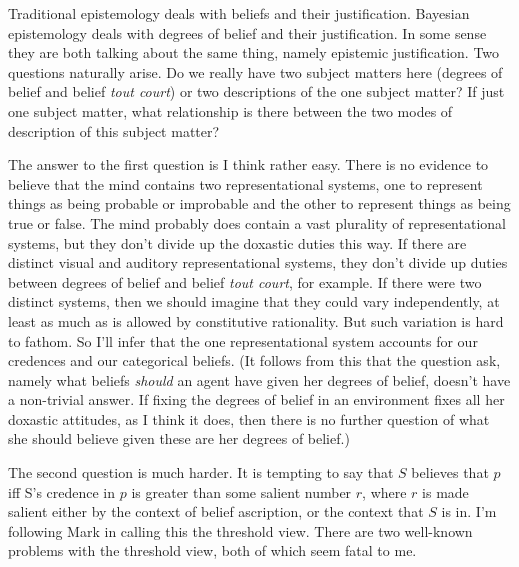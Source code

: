 Traditional epistemology deals with beliefs and their justification. Bayesian epistemology deals with degrees of belief and their justification. In some sense they are both talking about the same thing, namely epistemic justification. Two questions naturally arise. Do we really have two subject matters here (degrees of belief and belief \textit{tout court}) or two descriptions of the one subject matter? If just one subject matter, what relationship is there between the two modes of description of this subject matter?

The answer to the first question is I think rather easy. There is no evidence to believe that the mind contains two representational systems, one to represent things as being probable or improbable and the other to represent things as being true or false. The mind probably does contain a vast plurality of representational systems, but they don't divide up the doxastic duties this way. If there are distinct visual and auditory representational systems, they don't divide up duties between degrees of belief and belief \textit{tout court}, for example. If there were two distinct systems, then we should imagine that they could vary independently, at least as much as is allowed by constitutive rationality. But such variation is hard to fathom. So I'll infer that the one representational system accounts for our credences and our categorical beliefs. (It follows from this that the question \citet{Bovens1999} ask, namely what beliefs \textit{should} an agent have given her degrees of belief, doesn't have a non-trivial answer. If fixing the degrees of belief in an environment fixes all her doxastic attitudes, as I think it does, then there is no further question of what she should believe given these are her degrees of belief.) 

The second question is much harder. It is tempting to say that \(S\) believes that \(p\) iff S's credence in \(p\) is greater than some salient number \(r\), where \(r\) is made salient either by the context of belief ascription, or the context that \(S\) is in. I'm following Mark \citet{Kaplan1996} in calling this the threshold view. There are two well-known problems with the threshold view, both of which seem fatal to me.

